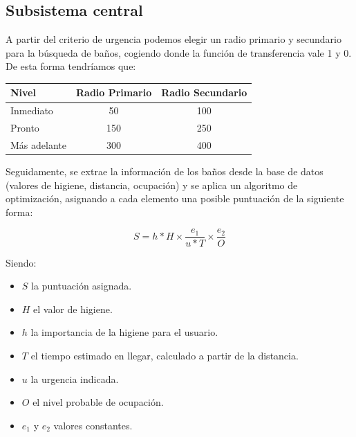 \documentclass[13pt,a4paper]{article}
\begin{document}
\subsection{Subsistema central}

A partir del criterio de urgencia podemos elegir un radio primario y secundario para la búsqueda de baños, cogiendo donde la función de transferencia vale 1 y 0. De esta forma tendríamos que:

\begin{table}[H]
  \centering
  \begin{tabular}{|l|c|c|}
  \hline
  \textbf{Nivel} & \multicolumn{1}{l|}{\textbf{Radio Primario}} & \multicolumn{1}{l|}{\textbf{Radio Secundario}} \\ \hline
  Inmediato      & 50          & 100           \\ \hline
  Pronto         & 150         & 250           \\ \hline
  Más adelante   & 300         & 400           \\ \hline
  \end{tabular}
\end{table}


\vspace{\baselineskip}

Seguidamente, se extrae la información de los baños desde la base de datos (valores de higiene, distancia, ocupación) y se aplica un algoritmo de optimización, asignando a cada elemento una posible puntuación de la siguiente forma:

\begin{equation}
  S = h*H \times \frac{e_{1}}{u*T} \times \frac{e_{2}}{O}
\end{equation}

Siendo:
\begin{itemize}
  \item $S$ la puntuación asignada.
  \item $H$ el valor de higiene.
  \item $h$ la importancia de la higiene para el usuario.
  \item $T$ el tiempo estimado en llegar, calculado a partir de la distancia.
  \item $u$ la urgencia indicada.
  \item $O$ el nivel probable de ocupación.
  \item $e_{1}$ y $e_{2}$ valores constantes.
\end{itemize} 
\end{document}
